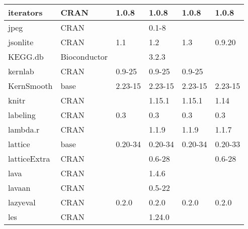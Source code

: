 \begin{longtable}{|llllll|}
iterators                     & CRAN                      & 1.0.8       & 1.0.8       & 1.0.8          & 1.0.8            \\ \hline
jpeg                          & CRAN                      &             & 0.1-8       &                &                   \\ \hline \rowcolor{gray!25}
jsonlite                      & CRAN                      & 1.1         & 1.2         & 1.3            & 0.9.20           \\ \hline
KEGG.db                       & Bioconductor              &             & 3.2.3       &                &                   \\ \hline \rowcolor{gray!25}
kernlab                       & CRAN                      & 0.9-25      & 0.9-25      & 0.9-25         &                  \\ \hline
KernSmooth                    & base                      & 2.23-15     & 2.23-15     & 2.23-15        & 2.23-15           \\ \hline \rowcolor{gray!25}
knitr                         & CRAN                      &             & 1.15.1      & 1.15.1         & 1.14             \\ \hline
labeling                      & CRAN                      & 0.3         & 0.3         & 0.3            & 0.3               \\ \hline \rowcolor{gray!25}
lambda.r                      & CRAN                      &             & 1.1.9       & 1.1.9          & 1.1.7            \\ \hline
lattice                       & base                      & 0.20-34     & 0.20-34     & 0.20-34        & 0.20-33           \\ \hline \rowcolor{gray!25}
latticeExtra                  & CRAN                      &             & 0.6-28      &                & 0.6-28           \\ \hline
lava                          & CRAN                      &             & 1.4.6       &                &                   \\ \hline \rowcolor{gray!25}
lavaan                        & CRAN                      &             & 0.5-22      &                &                  \\ \hline
lazyeval                      & CRAN                      & 0.2.0       & 0.2.0       & 0.2.0          & 0.2.0             \\ \hline \rowcolor{gray!25}
les                           & CRAN                      &             & 1.24.0      &                &                  \\ \hline

\end{longtable}
